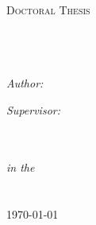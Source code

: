 \documentclass[
11pt, %
english, %
onehalfspacing %
]{MastersDoctoralThesis} %
\author{Oriol \textsc{Colomés}} %
\begin{document}
\frontmatter %

\pagestyle{plain} %


\begin{titlepage}
\begin{center}

\textsc{\LARGE \univname}\\[1.5cm] %
\textsc{\Large Doctoral Thesis}\\[0.5cm] %

\HRule \\[0.4cm] %
{\huge \bfseries \ttitle}\\[0.4cm] %
\HRule \\[1.5cm] %
 
\begin{minipage}{0.4\textwidth}
\begin{flushleft} \large
\emph{Author:}\\
{\authorname} %
\end{flushleft}
\end{minipage}
\begin{minipage}{0.4\textwidth}
\begin{flushright} \large
\emph{Supervisor:} \\
{\supname} %
\end{flushright}
\end{minipage}\\[3cm]
 
\large \textit{\degreename}\\[0.3cm] %
\textit{in the}\\[0.4cm]
\groupname\\\deptname\\[2cm] %
 
{\large \today}\\[4cm] %
 
\vfill
\end{center}
\end{titlepage}
\end{document}
